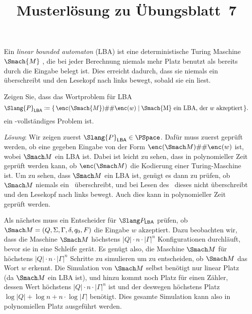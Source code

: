 \documentclass[german]{latteachCD}[2017/03/28]
\title{Musterlösung zu Übungsblatt~7}
\begin{document}
\maketitle

\vspace*{0.5\baselineskip}
\setcounter{exercise}{3}
\justifying

\begin{exercise}
  Ein \emph{linear bounded automaton} (LBA) ist eine deterministische Turing
  Maschine $\Smach{M}$ , die bei jeder Berechnung niemals mehr Platz benutzt als
  bereits durch die Eingabe belegt ist.  Dies erreicht  dadurch, dass
  sie niemals ein \textvisiblespace{} überschreibt und den Lesekopf nach links
  bewegt, sobald sie ein \textvisiblespace{} liest.

  Zeigen Sie, dass das Wortproblem für LBA
  \begin{equation*}
    \Slang{P}_{\mathsf{LBA}} \coloneqq \{\,\enc(\Smach{M})\#\#\enc(w) \mid
    \text{\Smach{M} ein LBA, der $w$ akzeptiert} \,\}.
  \end{equation*}
  ein \PSpace-vollständiges Problem ist.
\end{exercise}

\emph{Lösung}\/: Wir zeigen zuerst $\Slang{P}_{\mathsf{LBA}} \in \PSpace$.
Dafür muss zuerst geprüft werden, ob eine gegeben Eingabe von der Form
$\enc(\Smach M)\#\#\enc(w)$ ist, wobei $\Smach M$ ein LBA ist.  Dabei ist leicht
zu sehen, dass in polynomieller Zeit geprüft werden kann, ob $\enc(\Smach M)$
die Kodierung einer Turing-Maschine ist.  Um zu sehen, dass $\Smach M$ ein LBA
ist, genügt es dann zu prüfen, ob $\Smach M$ niemals ein~\blank{} überschreibt,
und bei Lesen des~\blank{} dieses nicht überschreibt und den Lesekopf nach links
bewegt.  Auch dies kann in polynomieller Zeit geprüft werden.

Als nächstes muss ein Entscheider für $\Slang P_{\mathsf{LBA}}$ prüfen, ob
$\Smach M = (Q,\Sigma,\Gamma,\delta,q_{0},F)$ die Eingabe $w$ akzeptiert.  Dazu
beobachten wir, dass die Maschine $\Smach M$ höchstens $\lvert Q\rvert \cdot n
\cdot \lvert \Gamma\rvert^{n}$ Konfigurationen durchläuft, bevor sie in eine
Schleife gerät.  Es genügt also, die Maschine $\Smach M$ für höchstens $\lvert
Q\rvert \cdot n \cdot \lvert \Gamma\rvert^{n}$ Schritte zu simulieren um zu
entscheiden, ob $\Smach M$ das Wort $w$ erkennt.  Die Simulation von $\Smach M$
selbst benötigt nur linear Platz (da $\Smach M$ ein LBA ist), und hinzu kommt
noch Platz für einen Zähler, dessen Wert höchstens $\lvert Q\rvert \cdot n \cdot
\lvert \Gamma\rvert^{n}$ ist und der deswegen höchstens Platz $\log \lvert
Q\vert + \log n + n \cdot \log\lvert \Gamma\rvert$ benötigt.  Dies gesamte
Simulation kann also in polynomiellen Platz ausgeführt werden.
\end{document}
